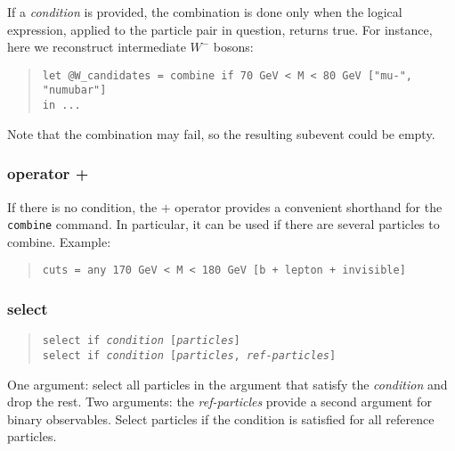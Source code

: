 \documentclass[12pt]{book}
\newcommand{\ttt}[1]{\texttt{#1}}
\begin{document}
If a \textit{condition} is provided, the combination is done only when the
logical expression, applied to the particle pair in question, returns true.
For instance, here we reconstruct intermediate $W^-$ bosons:
\begin{quote}
\begin{footnotesize}
\begin{verbatim}
let @W_candidates = combine if 70 GeV < M < 80 GeV ["mu-", "numubar"] 
in ...
\end{verbatim}
\end{footnotesize}
\end{quote}
Note that the combination may fail, so the resulting subevent could be empty.


\subsubsection{operator +}

If there is no condition, the $+$ operator provides a convenient
shorthand for the \verb|combine| command.  In particular, it can be
used if there are several particles to combine.  Example:
\begin{quote}
\begin{footnotesize}
\begin{verbatim}
cuts = any 170 GeV < M < 180 GeV [b + lepton + invisible]
\end{verbatim}
\end{footnotesize}
\end{quote}


\subsubsection{select}
\begin{quote}
\begin{footnotesize}
  \ttt{select if \textit{condition} [\textit{particles}]}   \\ 
  \ttt{select if \textit{condition} [\textit{particles}, \textit{ref-particles}]}
\end{footnotesize}
\end{quote}
One argument: select all particles in the argument that satisfy the
\textit{condition} and drop the rest.  Two arguments: the
\textit{ref-particles} provide a second argument for binary observables.
Select particles if the condition is satisfied for all reference particles.
\end{document}
